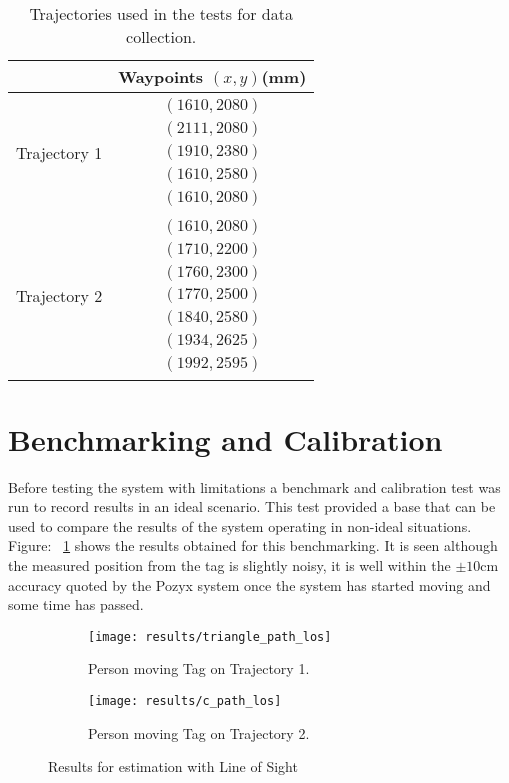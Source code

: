 \begin{table}[ht!]
    \centering
    \begin{tabular}{|c|c|}
        \hline
        & Waypoints $(x,y)$(mm)\\
        \hline
        Trajectory 1 & $\begin{array}{c}
                            (1610, 2080)\\
                            (2111, 2080)\\
                            (1910, 2380)\\
                            (1610, 2580)\\
                            (1610, 2080)
        \end{array}$\\
        \hline
        Trajectory 2 & $\begin{array}{c}
                            (1610, 2080)\\
                            (1710, 2200)\\
                            (1760, 2300)\\
                            (1770, 2500)\\
                            (1840, 2580)\\
                            (1934, 2625)\\
                            (1992, 2595)
        \end{array}$\\
        \hline
    \end{tabular}
    \caption{Trajectories used in the tests for data collection.}
    \label{tb:trajs}
\end{table}
\newpage
\section{Benchmarking and Calibration}\label{sec:benchmarking}
Before testing the system with limitations a benchmark and calibration test was run to record results in an ideal scenario.
This test provided a base that can be used to compare the results of the system operating in non-ideal situations.
Figure: ~\ref{fig:los} shows the results obtained for this benchmarking.
It is seen although the measured position from the tag is slightly noisy, it is well within the $\pm10$cm accuracy quoted by the Pozyx system once the system has started moving and some time has passed.
\begin{figure}[h!]
    \centering
    \begin{subfigure}{0.49\textwidth}
            \texttt{[image: results/triangle\_path\_los]}
            \caption{Person moving Tag on Trajectory 1.}
    \end{subfigure}
    \begin{subfigure}{0.49\textwidth}
            \texttt{[image: results/c\_path\_los]}
            \caption{Person moving Tag on Trajectory 2.}
    \end{subfigure}
    \caption{Results for estimation with Line of Sight}
    \label{fig:los}
\end{figure}

